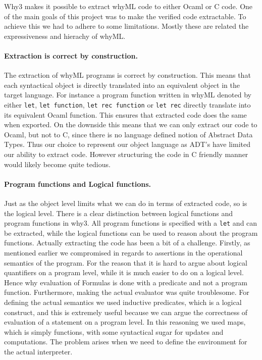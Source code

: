 Why3 makes it possible to extract whyML code to either Ocaml or C code.
One of the main goals of this project was to make the verified code extractable.
To achieve this we had to adhere to some limitations.
Mostly these are related the expressiveness and hierachy of whyML.

\paragraph{Extraction is correct by construction.}
The extraction of whyML programs is correct by construction.
This means that each syntactical object is directly translated into an equivalent object
in the target language. For instance a program function written in whyML denoted by either \texttt{let}, \texttt{let function}, \texttt{let rec function} or \texttt{let rec} directly translate into its equivalent Ocaml function. This ensures that extracted code does the same when exported.
On the downside this means that we can only extract our code to Ocaml, but not to C, since there is no
language defined notion of Abstract Data Types.
Thus our choice to represent our object language as ADT's have limited our ability to extract code.
However structuring the code in C friendly manner would likely become quite tedious.

\paragraph{Program functions and Logical functions.}
Just as the object level limits what we can do in terms of extracted code, so is the logical level.
There is a clear distinction between logical functions and program functions in why3.
All program functions is specified with a \texttt{let} and can be extracted,
while the logical functions can be used to reason about the program functions.
Actually extracting the code has been a bit of a challenge.
Firstly, as mentioned earlier we compromised in regards to assertions in the operational semantics of the program. For the reason that it is hard to argue about logical quantifiers on a program level, while it is much easier to do on a logical level. Hence why evaluation of Formulas is done with a predicate and not a program function.
Furthermore, making the actual evaluator was quite troublesome.
For defining the actual semantics we used inductive predicates, which is a logical construct, and this is extremely useful because we can argue the correctness of evaluation of a statement on a program level.
In this reasoning we used maps, which is simply functions, with some syntactical sugar for updates and computations.
The problem arises when we need to define the environment for the actual interpreter.


